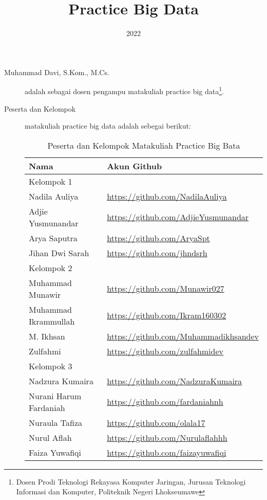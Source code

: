 \documentclass[a4paper]{tufte-handout}
\title{Practice Big Data}
\date{2022}
\begin{document}
\maketitle


\begin{projects}
\begin{description}
\item [Muhammad Davi, S.Kom., M.Cs.] adalah sebagai dosen pengampu matakuliah practice big data\footnote{Dosen Prodi Teknologi Rekayasa Komputer Jaringan, Jurusan Teknologi Informasi dan Komputer, Politeknik Negeri Lhokseumawe}.
\item [Peserta dan Kelompok] matakuliah practice big data adalah sebegai berikut:

\begin{table}[!ht]
\caption{Peserta dan Kelompok Matakuliah Practice Big Bata}
\label{tab:peserta}
\centering
\begin{tabular}{ll} 
\toprule
Nama &	Akun Github\\
\midrule
Kelompok 1\\
\midrule
Nadila Auliya	& \url{https://github.com/NadilaAuliya} \\
Adjie Yusmunandar		& \url{https://github.com/AdjieYusmunandar} \\
Arya Saputra			& \url{https://github.com/AryaSpt} \\
Jihan Dwi Sarah			& \url{https://github.com/jhndsrh} \\
\midrule
Kelompok 2\\
\midrule
Muhammad Munawir		& \url{https://github.com/Munawir027} \\
Muhammad Ikrammullah	& \url{https://github.com/Ikram160302} \\
M. Ikhsan				& \url{https://github.com/Muhammadikhsandev} \\
Zulfahmi				& \url{https://github.com/zulfahmidev} \\
\midrule
Kelompok 3\\
\midrule
Nadzura Kumaira			& \url{https://github.com/NadzuraKumaira} \\
Nurani Harum Fardaniah	& \url{https://github.com/fardaniahnh} \\
Nuraula Tafiza			& \url{https://github.com/olala17} \\
Nurul Aflah				& \url{https://github.com/Nurulaflahhh} \\
Faiza Yuwafiqi			& \url{https://github.com/faizayuwafiqi} \\

\end{tabular}
\end{table}
\end{description}
\end{projects}
\end{document}
